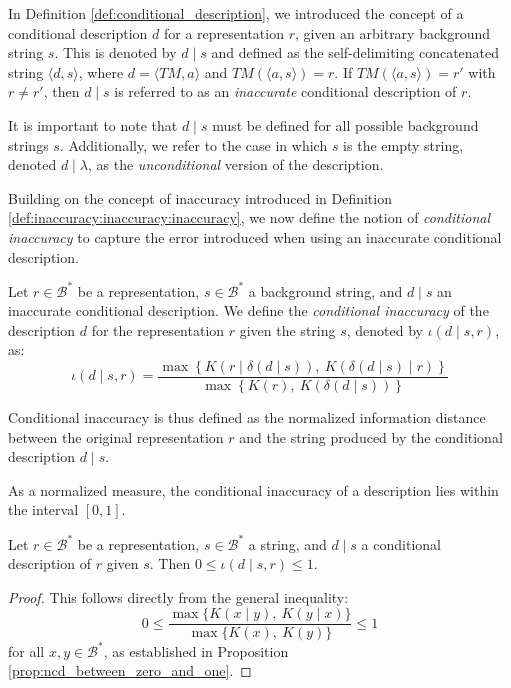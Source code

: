 In Definition \ref{def:conditional_description}, we introduced the concept of a conditional description $d$ for a representation $r$, given an arbitrary background string $s$. This is denoted by $d \mid s$ and defined as the self-delimiting concatenated string $\langle d, s \rangle$, where $d = \langle TM, a \rangle$ and $TM(\langle a, s \rangle) = r$. If $TM(\langle a, s \rangle) = r'$ with $r \neq r'$, then $d \mid s$ is referred to as an \emph{inaccurate} conditional description of $r$.

It is important to note that $d \mid s$ must be defined for all possible background strings $s$. Additionally, we refer to the case in which $s$ is the empty string, denoted $d \mid \lambda$, as the \emph{unconditional} version of the description.

Building on the concept of inaccuracy introduced in Definition \ref{def:inaccuracy:inaccuracy:inaccuracy}, we now define the notion of \emph{conditional inaccuracy} to capture the error introduced when using an inaccurate conditional description.

\begin{definition}
Let $r \in \mathcal{B}^\ast$ be a representation, $s \in \mathcal{B}^\ast$ a background string, and $d \mid s$ an inaccurate conditional description. We define the \emph{conditional inaccuracy} of the description $d$ for the representation $r$ given the string $s$, denoted by $\iota(d \mid s, r)$, as:
\[
\iota(d \mid s, r) = \frac{ \max\left\{ K \left(r \mid \delta(d \mid s) \right),\ K \left( \delta(d \mid s) \mid r \right) \right\} }{ \max\left\{ K(r),\ K \left( \delta(d \mid s) \right) \right\} }
\]
\end{definition}

Conditional inaccuracy is thus defined as the normalized information distance between the original representation $r$ and the string produced by the conditional description $d \mid s$.

As a normalized measure, the conditional inaccuracy of a description lies within the interval $[0, 1]$.

\begin{proposition}
\label{prop:range_conditional_inaccuracy}
Let $r \in \mathcal{B}^\ast$ be a representation, $s \in \mathcal{B}^\ast$ a string, and $d \mid s$ a conditional description of $r$ given $s$. Then $0 \leq \iota(d \mid s, r) \leq 1$.
\end{proposition}
\begin{proof}
This follows directly from the general inequality:
\[
0 \leq \frac{ \max\{ K(x \mid y),\ K(y \mid x) \} }{ \max\{ K(x),\ K(y) \} } \leq 1
\]
for all $x, y \in \mathcal{B}^\ast$, as established in Proposition \ref{prop:ncd_between_zero_and_one}.
\end{proof}

